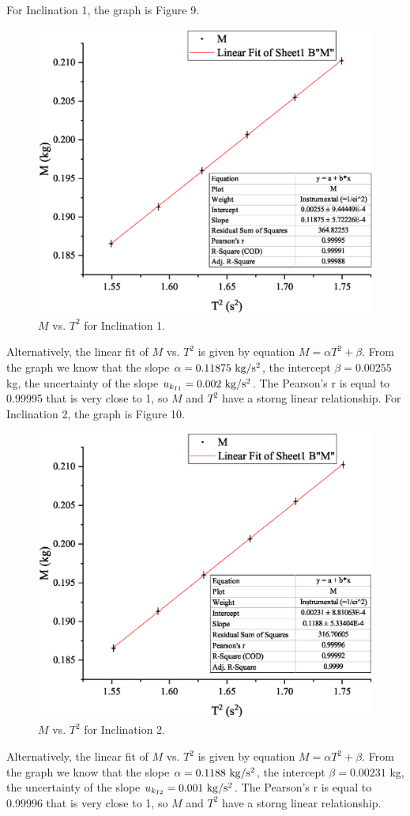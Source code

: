 \documentclass[a4paper]{report}
\begin{document}
	For Inclination 1, the graph is Figure 9.
	\begin{figure}[H]
		\centering
		\includegraphics[width=1\linewidth]{9.eps}
		\caption{$M$ vs. $T^2$ for Inclination 1.}
	\end{figure}
	Alternatively, the linear fit of $M$ vs. $T^2$ is given by equation $M=\alpha T^2+\beta$. From the graph we know that the slope $\alpha=0.11875\ \rm{kg/s^2}$, the intercept $\beta=0.00255$ kg, the uncertainty of the slope $u_{k_{I1}}=0.002\ \rm{kg/s^2}$. The Pearson's r is equal to 0.99995 that is very close to 1, so $M$ and $T^2$ have a storng linear relationship.
	For Inclination 2, the graph is Figure 10.
	\begin{figure}[H]
		\centering
		\includegraphics[width=1\linewidth]{10.eps}
		\caption{$M$ vs. $T^2$ for Inclination 2.}
	\end{figure}
	Alternatively, the linear fit of $M$ vs. $T^2$ is given by equation $M=\alpha T^2+\beta$. From the graph we know that the slope $\alpha=0.1188\ \rm{kg/s^2}$, the intercept $\beta=0.00231$ kg, the uncertainty of the slope $u_{k_{I2}}=0.001\ \rm{kg/s^2}$. The Pearson's r is equal to 0.99996 that is very close to 1, so $M$ and $T^2$ have a storng linear relationship.
\end{document}
